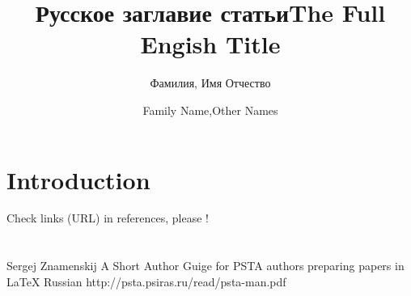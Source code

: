 \documentclass[utf8,english]{psta}%
\title{Русское заглавие статьи}
\author{Фамилия, Имя Отчество}
\title[a (shorter) version of title]{The Full Engish Title}
\author{Family Name,Other Names}
\begin{document}
          
\maketitle 
\section*{Introduction}
Check links (URL) in references, please \cite{PSTAmanual}!
\section{}
\subsection{}


\begin{thebibliography}{30}
% 
%    
\by Sergej Znamenskij
\preprint A Short Author Guige for PSTA authors preparing papers in \LaTeX
{} 
\lang Russian
\URL http://psta.psiras.ru/read/psta-man.pdf

\end{thebibliography}
\end{document}
